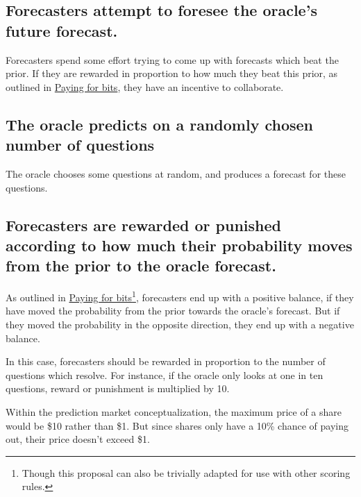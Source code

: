 \documentclass[]{article}
\begin{document}
\hypertarget{forecasters-attempt-to-foresee-the-oracles-future-forecast.}{%
\subsection{Forecasters attempt to foresee the oracle's future
forecast.}\label{forecasters-attempt-to-foresee-the-oracles-future-forecast.}}

Forecasters spend some effort trying to come up with forecasts which
beat the prior. If they are rewarded in proportion to how much they beat
this prior, as outlined in \href{}{Paying for bits}, they have an
incentive to collaborate.

\hypertarget{the-oracle-predicts-on-a-randomly-chosen-number-of-questions}{%
\subsection{The oracle predicts on a randomly chosen number of
questions}\label{the-oracle-predicts-on-a-randomly-chosen-number-of-questions}}

The oracle chooses some questions at random, and produces a forecast for
these questions.

\hypertarget{forecasters-are-rewarded-or-punished-according-to-how-much-their-probability-moves-from-the-prior-to-the-oracle-forecast.}{%
\subsection{Forecasters are rewarded or punished according to how much
their probability moves from the prior to the oracle
forecast.}\label{forecasters-are-rewarded-or-punished-according-to-how-much-their-probability-moves-from-the-prior-to-the-oracle-forecast.}}

As outlined in \href{}{Paying for bits}\footnote{Though this proposal
  can also be trivially adapted for use with other scoring rules.},
forecasters end up with a positive balance, if they have moved the
probability from the prior towards the oracle's forecast. But if they
moved the probability in the opposite direction, they end up with a
negative balance.

In this case, forecasters should be rewarded in proportion to the number
of questions which resolve. For instance, if the oracle only looks at
one in ten questions, reward or punishment is multiplied by 10.

Within the prediction market conceptualization, the maximum price of a
share would be \$10 rather than \$1. But since shares only have a 10\%
chance of paying out, their price doesn't exceed \$1.
\end{document}
